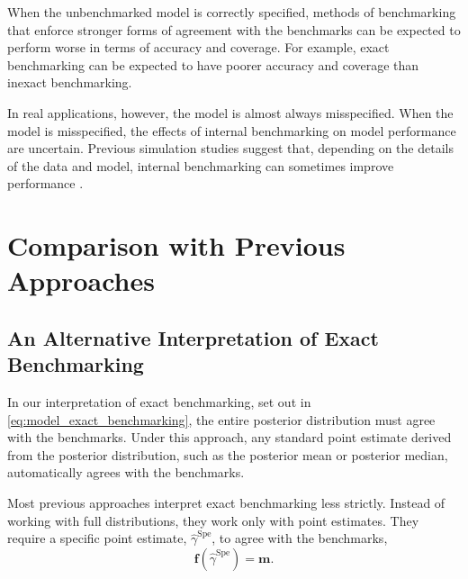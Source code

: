 \documentclass[12pt]{article}
\begin{document}
When the unbenchmarked model is correctly specified, methods of benchmarking that enforce stronger forms of agreement with the benchmarks can be expected to perform worse in terms of accuracy and coverage.  For example, exact benchmarking can be expected to have poorer accuracy and coverage than inexact benchmarking.

In real applications, however, the model is almost always misspecified.  When the model is misspecified, the effects of internal benchmarking on model performance are uncertain.  Previous simulation studies suggest that, depending on the details of the data and model, internal benchmarking can sometimes improve performance \citep{pfeffermann2006small, nandram2011bayesian, pfeffermann2013new, vesper2013three}.


\section{Comparison with Previous Approaches}

\subsection{An Alternative Interpretation of Exact Benchmarking}
  \label{sec:alt_interp}

In our interpretation of exact benchmarking, set out in \eqref{eq:model_exact_benchmarking}, the entire posterior distribution must agree with the benchmarks.  Under this approach, any standard point estimate derived from the posterior distribution, such as the posterior mean or posterior median, automatically agrees with the benchmarks.

Most previous approaches interpret exact benchmarking less strictly.  Instead of working with full distributions, they work only with point estimates.  They require a specific point estimate, $\hat{\gamma}^{\text{Spe}}$, to agree with the benchmarks,
\begin{equation}
 \bm{f}(\hat{\gamma}^{\text{Spe}})=\bm{m}.
\end{equation}
\end{document}
